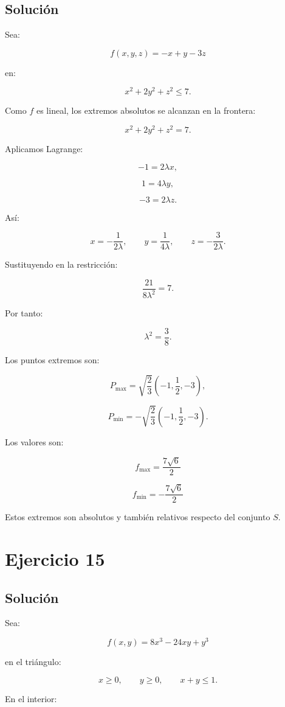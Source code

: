 \documentclass[11pt,a4paper]{article}
\begin{document}
\subsection{Solución}

Sea:

\[
f(x,y,z)
=
-x+y-3z
\]

en:

\[
x^2+2y^2+z^2\leq7.
\]

Como \(f\) es lineal, los extremos absolutos se alcanzan en la frontera:

\[
x^2+2y^2+z^2=7.
\]

Aplicamos Lagrange:

\[
-1=2\lambda x,
\]

\[
1=4\lambda y,
\]

\[
-3=2\lambda z.
\]

Así:

\[
x=-\frac1{2\lambda},
\qquad
y=\frac1{4\lambda},
\qquad
z=-\frac3{2\lambda}.
\]

Sustituyendo en la restricción:

\[
\frac{21}{8\lambda^2}=7.
\]

Por tanto:

\[
\lambda^2=\frac38.
\]

Los puntos extremos son:

\[
P_{\max}
=
\sqrt{\frac23}
\left(
-1,\frac12,-3
\right),
\]

\[
P_{\min}
=
-\sqrt{\frac23}
\left(
-1,\frac12,-3
\right).
\]

Los valores son:

\[
\boxed{
f_{\max}
=
\frac{7\sqrt6}{2}
}
\]

\[
\boxed{
f_{\min}
=
-\frac{7\sqrt6}{2}
}
\]

Estos extremos son absolutos y también relativos respecto del conjunto \(S\).

\section{Ejercicio 15}
\subsection{Solución}

Sea:

\[
f(x,y)
=
8x^3-24xy+y^3
\]

en el triángulo:

\[
x\geq0,
\qquad
y\geq0,
\qquad
x+y\leq1.
\]

En el interior:
\end{document}
